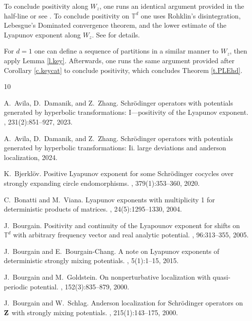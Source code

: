 \documentclass{amsart}
\newcommand{\TT}{\mathbb{T}}
\begin{document}
To conclude positivity along $W_z$, one runs an identical argument provided in the half-line or see \cite{young}. To conclude positivity on $\TT^d$ one uses Rohklin's disintegration, Lebesgue's Dominated convergence theorem, and the lower estimate of the Lyapunov exponent along $W_z$. See \cite[Proposition 1]{chiem} for details.

For $d=1$ one can define a sequence of partitions in a similar manner to $W_z$, then apply Lemma \ref{l.key}. Afterwards, one runs the same argument provided after Corollary \ref{c.keycat} to conclude positivity, which concludes Theorem \ref{t.PLEhd}.

\begin{thebibliography}{10}

A.~Avila, D.~Damanik, and Z.~Zhang.
\newblock Schr\"odinger operators with potentials generated by hyperbolic transformations: {I}---positivity of the {L}yapunov exponent.
, 231(2):851--927, 2023.

A.~Avila, D.~Damanik, and Z.~Zhang.
\newblock Schr\"odinger operators with potentials generated by hyperbolic transformations: Ii. large deviations and anderson localization, 2024.

K.~Bjerkl\"ov.
\newblock Positive {L}yapunov exponent for some {S}chr\"odinger cocycles over strongly expanding circle endomorphisms.
, 379(1):353--360, 2020.

C.~Bonatti and M.~Viana.
\newblock Lyapunov exponents with multiplicity 1 for deterministic products of matrices.
, 24(5):1295--1330, 2004.

J.~Bourgain.
\newblock Positivity and continuity of the {L}yapounov exponent for shifts on {$\TT^d$} with arbitrary frequency vector and real analytic potential.
, 96:313--355, 2005.

J.~Bourgain and E.~Bourgain-Chang.
\newblock A note on {L}yapunov exponents of deterministic strongly mixing potentials.
, 5(1):1--15, 2015.

J.~Bourgain and M.~Goldstein.
\newblock On nonperturbative localization with quasi-periodic potential.
, 152(3):835--879, 2000.

J.~Bourgain and W.~Schlag.
\newblock Anderson localization for {S}chr\"odinger operators on {$\bf Z$} with strongly mixing potentials.
, 215(1):143--175, 2000.


\end{thebibliography}
\end{document}
